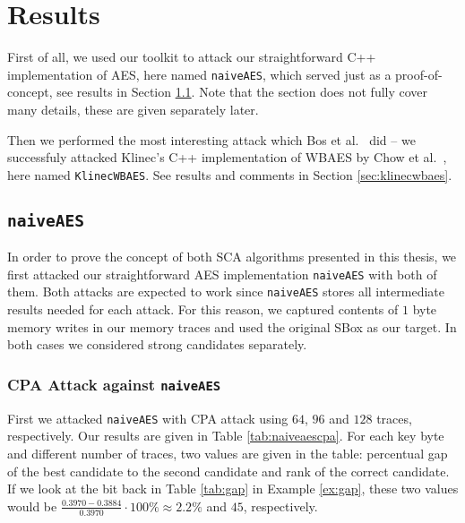 \section{Results}
\label{sec:results}

First of all, we used our toolkit to attack our straightforward C++ implementation of AES, here named {\tt naiveAES}, which served just as a proof-of-concept, see results in Section \ref{sec:naiveaes}. Note that the section does not fully cover many details, these are given separately later.

Then we performed the most interesting attack which Bos et al.\ \cite{bos2015differential} did -- we successfuly attacked Klinec's C++ implementation \cite{klinec2013implementation} of WBAES by Chow et al.\ \cite{chow2002aes}, here named {\tt KlinecWBAES}. See results and comments in Section \ref{sec:klinecwbaes}.



\subsection{\tt naiveAES}
\label{sec:naiveaes}

In order to prove the concept of both SCA algorithms presented in this thesis, we first attacked our straightforward AES implementation {\tt naiveAES} with both of them. Both attacks are expected to work since {\tt naiveAES} stores all intermediate results needed for each attack. For this reason, we captured contents of $1$ byte memory writes in our memory traces and used the original SBox as our target. In both cases we considered strong candidates separately.

\subsubsection{CPA Attack against {\tt naiveAES}}
	
	First we attacked {\tt naiveAES} with CPA attack using $64$, $96$ and $128$ traces, respectively. Our results are given in Table \ref{tab:naiveaescpa}. For each key byte and different number of traces, two values are given in the table: percentual gap of the best candidate to the second candidate and rank of the correct candidate. If we look at the  bit back in Table \ref{tab:gap} in Example \ref{ex:gap}, these two values would be $\frac{0.3970-0.3884}{0.3970}\cdot100\%\approx2.2\%$ and $45$, respectively.
	
